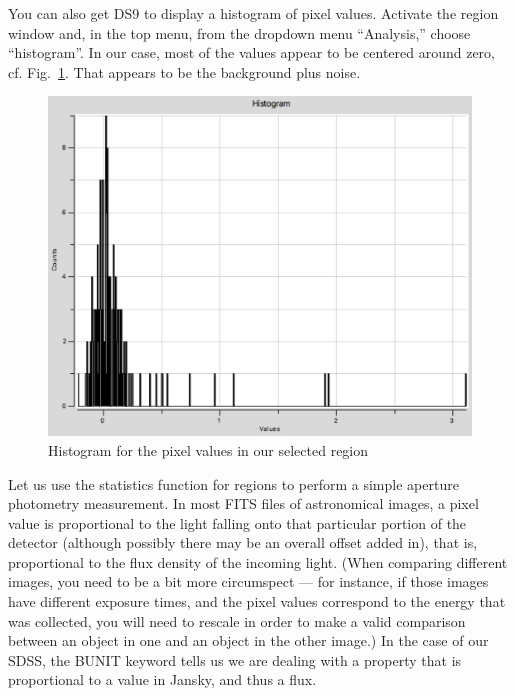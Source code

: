 \documentclass[twocolumn,apj]{openjournal}
\begin{document}
You can also get DS9 to display a histogram of pixel values. Activate the region window and, in the top menu, from the dropdown menu ``Analysis,'' choose ``histogram''. In our case, most of the values appear to be centered around zero, cf. Fig.~\ref{DS9Histo}. That appears to be the background plus noise.
\begin{figure}[htbp]
\begin{center}
\includegraphics[width=\linewidth]{ds9histogram.jpg}
\caption{Histogram for the pixel values in our selected region}
\label{DS9Histo}
\end{center}
\end{figure}

Let us use the statistics function for regions to perform a simple aperture photometry measurement. In most FITS files of astronomical images, a pixel value is proportional to the light falling onto that particular portion of the detector (although possibly there may be an overall offset added in), that is, proportional to the flux density of the incoming light. (When comparing different images, you need to be a bit more circumspect --- for instance, if those images have different exposure times, and the pixel values correspond to the energy that was collected, you will need to rescale in order to make a valid comparison between an object in one and an object in the other image.) In the case of our SDSS, the BUNIT keyword tells us we are dealing with a property that is proportional to a value in Jansky, and thus a flux. 
\end{document}
